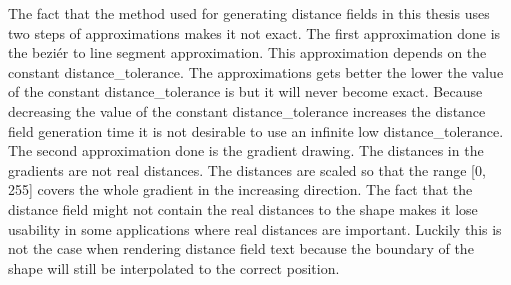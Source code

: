 The fact that the method used for generating distance fields in this thesis uses two steps of approximations makes it not exact. The first approximation done is the beziér to line segment approximation. This approximation depends on the constant distance\_tolerance. The approximations gets better the lower the value of the constant distance\_tolerance is but it will never become exact. Because decreasing the value of the constant distance\_tolerance increases the distance field generation time it is not desirable to use an infinite low distance\_tolerance. The second approximation done is the gradient drawing. The distances in the gradients are not real distances. The distances are scaled so that the range [0, 255] covers the whole gradient in the increasing direction. The fact that the distance field might not contain the real distances to the shape makes it lose usability in some applications where real distances are important. Luckily this is not the case when rendering distance field text because the boundary of the shape will still be interpolated to the correct position.